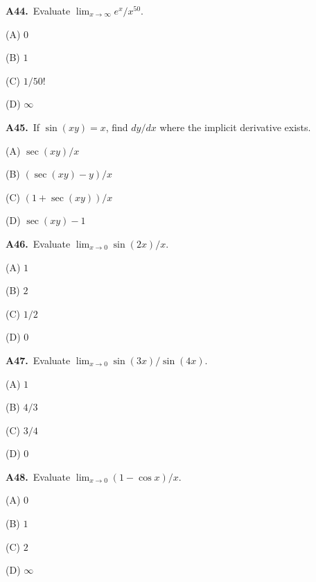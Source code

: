 \documentclass[11pt]{article}
\begin{document}
\bigskip\noindent\textbf{A44.}\ Evaluate $\lim_{x\to\infty}e^x/x^{50}$.
\begin{list}{}{\setlength{\leftmargin}{3em}\setlength{\labelwidth}{2.5em}\setlength{\itemsep}{0pt}\setlength{\topsep}{2pt}}
\item[(A)] $0$
\item[(B)] $1$
\item[(C)] $1/50!$
\item[(D)] $\infty$
\end{list}

\bigskip\noindent\textbf{A45.}\ If $\sin(xy)=x$, find $dy/dx$ where the implicit derivative exists.
\begin{list}{}{\setlength{\leftmargin}{3em}\setlength{\labelwidth}{2.5em}\setlength{\itemsep}{0pt}\setlength{\topsep}{2pt}}
\item[(A)] $\sec(xy)/x$
\item[(B)] $(\sec(xy)-y)/x$
\item[(C)] $(1+\sec(xy))/x$
\item[(D)] $\sec(xy)-1$
\end{list}

\bigskip\noindent\textbf{A46.}\ Evaluate $\lim_{x\to0}\sin(2x)/x$.
\begin{list}{}{\setlength{\leftmargin}{3em}\setlength{\labelwidth}{2.5em}\setlength{\itemsep}{0pt}\setlength{\topsep}{2pt}}
\item[(A)] $1$
\item[(B)] $2$
\item[(C)] $1/2$
\item[(D)] $0$
\end{list}

\bigskip\noindent\textbf{A47.}\ Evaluate $\lim_{x\to0}\sin(3x)/\sin(4x)$.
\begin{list}{}{\setlength{\leftmargin}{3em}\setlength{\labelwidth}{2.5em}\setlength{\itemsep}{0pt}\setlength{\topsep}{2pt}}
\item[(A)] $1$
\item[(B)] $4/3$
\item[(C)] $3/4$
\item[(D)] $0$
\end{list}

\bigskip\noindent\textbf{A48.}\ Evaluate $\lim_{x\to0}(1-\cos x)/x$.
\begin{list}{}{\setlength{\leftmargin}{3em}\setlength{\labelwidth}{2.5em}\setlength{\itemsep}{0pt}\setlength{\topsep}{2pt}}
\item[(A)] $0$
\item[(B)] $1$
\item[(C)] $2$
\item[(D)] $\infty$
\end{list}
\end{document}
